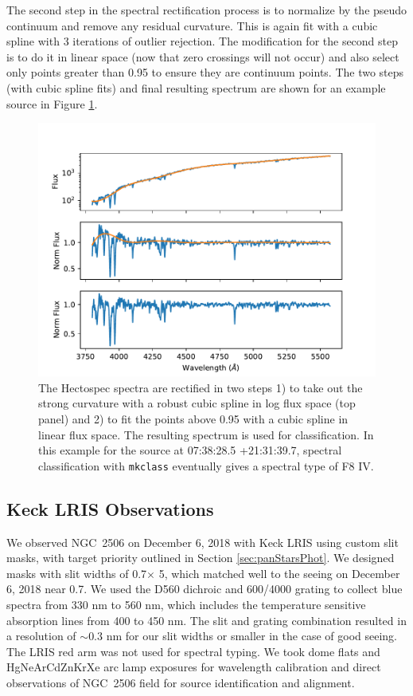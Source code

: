 \documentclass{aastex6}
\begin{document}
The second step in the spectral rectification process is to normalize by the pseudo continuum and remove any residual curvature.
This is again fit with a cubic spline with 3 iterations of outlier rejection.
The modification for the second step is to do it in linear space (now that zero crossings will not occur) and also select only points greater than 0.95 to ensure they are continuum points.
The two steps (with cubic spline fits) and final resulting spectrum are shown for an example source in Figure \ref{fig:SpecRect}.

\begin{figure}[!hbtp]
\centering
\includegraphics[width=.7\columnwidth]{images/O_0738284_p2131_spec.pdf}
\caption{The Hectospec spectra are rectified in two steps 1) to take out the strong curvature with a robust cubic spline in log flux space (top panel) and 2) to fit the points above 0.95 with a cubic spline in linear flux space.
The resulting spectrum is used for classification.
In this example for the source at 07:38:28.5 +21:31:39.7, spectral classification with \texttt{mkclass} eventually gives a spectral type of F8 IV.}\label{fig:SpecRect}
\end{figure}

\subsection{Keck LRIS Observations}\label{sec:keckLRIS}
We observed NGC~2506 on December 6, 2018 with Keck LRIS using custom slit masks, with target priority outlined in Section \ref{sec:panStarsPhot}.
We designed masks with slit widths of 0.7\arcsec $\times$ 5\arcsec, which matched well to the seeing on December 6, 2018 near 0.7\arcsec.
We used the D560 dichroic and 600/4000 grating to collect blue spectra from 330 nm to 560 nm, which includes the temperature sensitive absorption lines from 400 to 450 nm.
The slit and grating combination resulted in a resolution of $\sim$0.3 nm for our slit widths or smaller in the case of good seeing.
The LRIS red arm was not used for spectral typing.
We took dome flats and HgNeArCdZnKrXe  arc lamp exposures for wavelength calibration and direct observations of NGC~2506 field for source identification and alignment.
\end{document}
